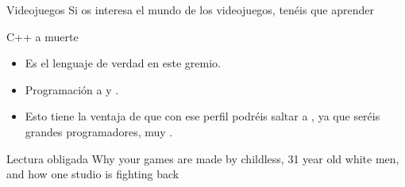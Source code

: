 \documentclass[14pt]{beamer}
\newcommand{\WebLink}[2]{
  \href{#1}{\structure{\ding{43}~\color{sail-green}{#2}}}
}
\begin{document}
\begin{frame}{Videojuegos}
  \centering \small
  Si os interesa el mundo de los videojuegos, tenéis que aprender

  \begin{alertblock}{}
    \centering \LARGE C++ a muerte
  \end{alertblock}

  \begin{itemize} \small
    \itemsep0em
    \item Es el lenguaje de verdad en este gremio.
    \item Programación a  y .
    \item Esto tiene la ventaja de que con ese perfil podréis saltar
      a , ya que seréis grandes
      programadores, muy .
  \end{itemize}

  \begin{block}{\centering \small Lectura obligada}
    \centering \small Why your games are made by childless, 31 year
    old white men, and how one studio is fighting back
    \WebLink{https://web.archive.org/web/20131211193933/http://penny-arcade.com/report/article/why-your-games-are-made-by-childless-31-year-old-white-men-and-how-one-stud}
            {Internet Archive}
  \end{block}
\end{frame}
\end{document}
